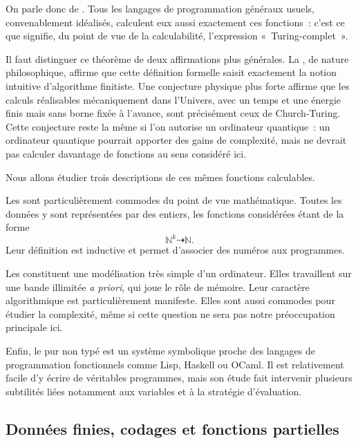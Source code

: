 On parle donc de .
Tous les langages de programmation généraux usuels, convenablement
idéalisés, calculent eux aussi exactement ces fonctions : c'est ce que
signifie, du point de vue de la calculabilité, l'expression
« Turing-complet ».

Il faut distinguer ce théorème de deux affirmations plus générales.  La
, de nature
philosophique, affirme que cette définition formelle saisit exactement
la notion intuitive d'algorithme finitiste.  Une conjecture physique
plus forte affirme que les calculs réalisables mécaniquement dans
l'Univers, avec un temps et une énergie finis mais sans borne fixée à
l'avance, sont précisément ceux de Church-Turing.  Cette conjecture
reste la même si l'on autorise un ordinateur quantique : un ordinateur
quantique pourrait apporter des gains de complexité, mais ne devrait
pas calculer davantage de fonctions au sens considéré ici.

\thingy Nous allons étudier trois descriptions de ces mêmes fonctions
calculables.

Les  sont particulièrement
commodes du point de vue mathématique.  Toutes les données y sont
représentées par des entiers, les fonctions considérées étant de la
forme
\[
\mathbb{N}^k\dasharrow\mathbb{N}.
\]
Leur définition est inductive et permet d'associer des numéros aux
programmes.

Les  constituent une modélisation très simple
d'un ordinateur.  Elles travaillent sur une bande illimitée \textit{a
priori}, qui joue le rôle de mémoire.  Leur caractère algorithmique est
particulièrement manifeste.  Elles sont aussi commodes pour étudier la
complexité, même si cette question ne sera pas notre préoccupation
principale ici.

Enfin, le  pur non typé est un système
symbolique proche des langages de programmation fonctionnels comme
Lisp, Haskell ou OCaml.  Il est relativement facile d'y écrire de
véritables programmes, mais son étude fait intervenir plusieurs
subtilités liées notamment aux variables et à la stratégie
d'évaluation.

\subsection{Données finies, codages et fonctions partielles}
\label{subsection-finite-data-and-partial-functions}

